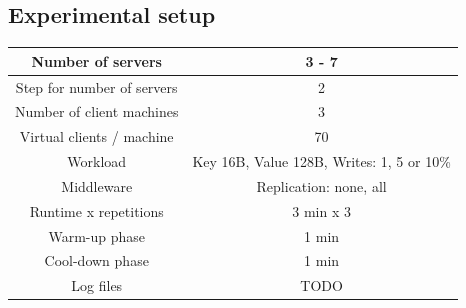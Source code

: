\documentclass[11pt]{article}
\begin{document}
\subsection{Experimental setup}

\small{
\smallskip
\begin{tabular}{|c|c|}
\hline Number of servers & 3 - 7 \\ 
\hline Step for number of servers & 2 \\
\hline Number of client machines & 3 \\ 
\hline Virtual clients / machine &  70 \\ 
\hline Workload & Key 16B, Value 128B, Writes: 1, 5 or 10\% \\
\hline Middleware & Replication: none, all \\ 
\hline Runtime x repetitions & 3 min x 3 \\
\hline Warm-up phase & 1 min \\
\hline Cool-down phase & 1 min \\
\hline Log files & TODO \\
\hline 
\end{tabular} }
\medskip
\end{document}
